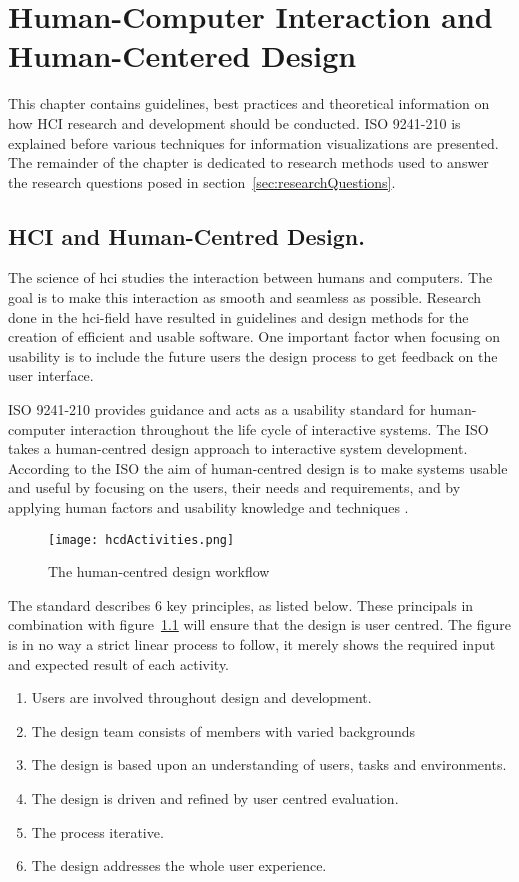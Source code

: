 \chapter{Human-Computer Interaction and Human-Centered Design}
\label{ch:hci}
This chapter contains guidelines, best practices and theoretical information on how HCI research and development should be conducted. ISO 9241-210 is explained before various techniques for information visualizations are presented. The remainder of the chapter is dedicated to research methods used to answer the research questions posed in section~\ref{sec:researchQuestions}.

\section{HCI and Human-Centred Design.}
The science of \gls{hci} studies the interaction between humans and computers. The goal is to make this interaction as smooth and seamless as possible. Research done in the \gls{hci}-field have resulted in guidelines and design methods for the creation of efficient and usable software. One important factor when focusing on usability is to include the future users the design process to get feedback on the user interface.

ISO 9241-210 provides guidance and acts as a usability standard for human-computer interaction throughout the life cycle of interactive systems. The ISO takes a human-centred design approach to interactive system development. According to the ISO the aim of human-centred design is to make systems usable and useful by focusing on the users, their needs and requirements, and by applying human factors and usability knowledge and techniques \cite{iso9241}.

\begin{figure}[h!]
	\centering
		\texttt{[image: hcdActivities.png]}
		\caption{\footnotesize The human-centred design workflow}
		\label{fig:hcdActivities}
\end{figure}

The standard describes 6 key principles, as listed below. These principals in combination with figure~\ref{fig:hcdActivities} will ensure that the design is user centred. The figure is in no way a strict linear process to follow, it merely shows the required input and expected result of each activity.

\begin{enumerate}
  \item Users are involved throughout design and development.
  \item The design team consists of members with varied backgrounds
  \item The design is based upon an understanding of users, tasks and environments.
  \item The design is driven and refined by user centred evaluation.
  \item The process iterative.
  \item The design addresses the whole user experience.
\end{enumerate}


